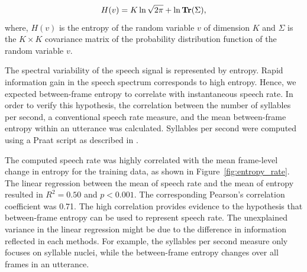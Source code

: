 \begin{equation}
    H(v) = K \ln{\sqrt{2\pi}} + \ln{\operatorname{\textbf{Tr}}({\Sigma})},
\end{equation}
where, $H(v)$ is the entropy of the random variable $v$ of dimension $K$ and $\Sigma$ is the $ K \times K $ covariance matrix of the probability distribution function of the random variable $v$.  

The spectral variability of the speech signal is represented by entropy. Rapid information gain in the speech spectrum corresponds to high entropy. Hence, we expected between-frame entropy to correlate with instantaneous speech rate. In order to verify this hypothesis, the correlation between the number of syllables per second, a conventional speech rate measure, and the mean between-frame entropy within an utterance was calculated. Syllables per second were computed using a Praat script as described in \cite{DeJong2009}.

The computed speech rate was highly correlated with the mean frame-level change in entropy for the training data, as shown in Figure~\ref{fig:entropy_rate}. The linear regression between the mean of speech rate and the mean of entropy resulted in $R^2=0.50$ and $p<0.001$.  The corresponding Pearson's correlation coefficient was 0.71. The high correlation provides evidence to the hypothesis that between-frame entropy can be used to represent speech rate.
The unexplained variance in the linear regression might be due to the difference in information reflected in each methods.
For example, the syllables per second measure only focuses on syllable nuclei, while the between-frame entropy changes over all frames in an utterance.



